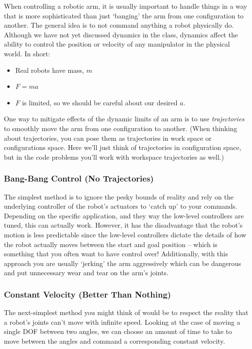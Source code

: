 \documentclass{16384_doc}
\begin{document}
When controlling a robotic arm, it is usually important to handle things in a
way that is more sophisticated than just `banging' the arm from one
configuration to another.  The general idea is to not command anything a robot
 physically do.  Although we have not yet discussed dynamics in the class,
dynamics affect the ability to control the position or velocity of any
manipulator in the physical world.  In short:
\begin{itemize}
\item Real robots have mass, $m$
\item $F = ma$
\item $F$ is limited, so we should be careful about our desired $a$.
\end{itemize}

One way to mitigate effects of the dynamic limits of an arm is to use
\emph{trajectories} to smoothly move the arm from one configuration to another.
(When thinking about trajectories, you can pose them as trajectories in work
space or configurations space.  Here we'll just think of trajectories in
configuration space, but in the code problems you'll work with workspace
trajectories as well.)

\subsubsection{Bang-Bang Control (No Trajectories)}
The simplest method is to ignore the pesky bounds of reality and rely on the
underlying controller of the robot's actuators to `catch up' to your commands.
Depending on the specific application, and they way the low-level controllers
are tuned, this can actually work.  However, it has the disadvantage that the
robot's motion is less predictable since the low-level controllers dictate the
details of how the robot actually moves between the start and goal position --
which is something that you often want to have control over!  Additionally, with
this approach you are usually ‘jerking’ the arm aggressively which can be
dangerous and put unnecessary wear and tear on the arm’s joints.

\subsubsection{Constant Velocity (Better Than Nothing)}
The next-simplest method you might think of would be to respect the reality that a
robot’s joints can’t move with infinite speed.  Looking at the case of moving a
single DOF between two angles, we can choose an amount of time to take to move
between the angles and command a corresponding constant velocity.
\end{document}
